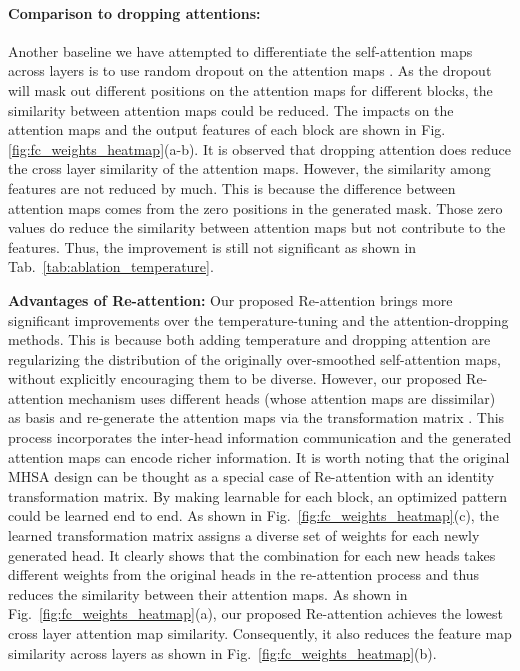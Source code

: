 \documentclass[10pt,twocolumn,letterpaper]{article}
\newcommand{\nameofatten}{Re-attention}
\newcommand{\myPara}[1]{\vspace{.05in}\noindent\textbf{#1}}
\begin{document}
\paragraph{Comparison to dropping attentions:}
Another baseline we have attempted to differentiate the self-attention maps across layers is to use random dropout on the attention maps . 
As the dropout will mask out    different   positions on the attention maps for different blocks, the similarity between attention maps could be reduced.
The impacts on the attention maps and the output features of each block are shown in Fig. \ref{fig:fc_weights_heatmap}(a-b). It is observed that dropping attention does reduce the cross layer similarity of the attention maps. However, the similarity among features are not reduced by much. This is because the difference between attention maps comes from the zero positions in the generated mask. Those zero values do reduce the similarity between attention maps but not contribute to the features. Thus, the improvement is still not significant as shown in Tab.~\ref{tab:ablation_temperature}.











\myPara{Advantages of \nameofatten{}:}
Our proposed \nameofatten{} brings  more significant improvements over the temperature-tuning and the attention-dropping  methods. This is because both adding temperature and dropping  attention are regularizing the distribution of the originally over-smoothed self-attention maps, without explicitly encouraging them to be diverse. However, our proposed \nameofatten{} mechanism
 uses different heads (whose attention maps are dissimilar) as basis and  re-generate the attention maps via the transformation matrix . This process incorporates the inter-head information communication and the generated attention maps can encode richer information. It is worth noting that the original MHSA design can be thought as a special case of \nameofatten{} with an identity  transformation matrix. By making  learnable for each block, an optimized pattern could be learned end to end.  As shown in Fig.~\ref{fig:fc_weights_heatmap}(c), the learned transformation matrix assigns a diverse set of weights for each newly generated head. It clearly shows that the combination for each new heads takes different weights from the original heads in the re-attention process and thus reduces the   similarity between their attention maps. As shown in Fig.~\ref{fig:fc_weights_heatmap}(a), our proposed \nameofatten{} achieves the lowest cross layer attention map similarity. Consequently, it also reduces the feature map similarity across layers as shown in Fig.~\ref{fig:fc_weights_heatmap}(b).  
 
\end{document}
